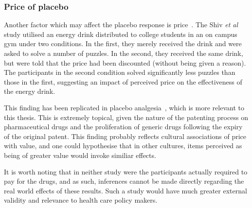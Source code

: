 




\subsubsection{Price of placebo}
\label{sec:price}

Another factor which may affect the placebo response is price~\cite{Shiv2005a}. The Shiv \textit{et al} study utilised an energy drink distributed to college students in an on campus gym under two conditions. In the first, they merely received the drink and were asked to solve a number of puzzles. In the second, they received the same drink, but were told that the price had been discounted (without being given a reason). The participants in the second condition solved significantly less puzzles than those in the first, suggesting an impact of perceived price on the effectiveness of the energy drink. 

This finding has been replicated in placebo analgesia~\cite{Waber2008}, which is more relevant to this thesis. This is extremely topical, given the nature of the patenting process on pharmaceutical drugs and the proliferation of generic drugs following the expiry of the original patent. This finding probably reflects cultural associations of price with value, and one could hypothesise that in other cultures, items perceived as being of greater value would invoke similiar effects.  



It is worth noting that in neither study were the participants actually required to pay for the drugs, and as such, inferences cannot be made directly regarding the real world effects of these results. Such a study would have much greater external validity and relevance to health care policy makers. 





